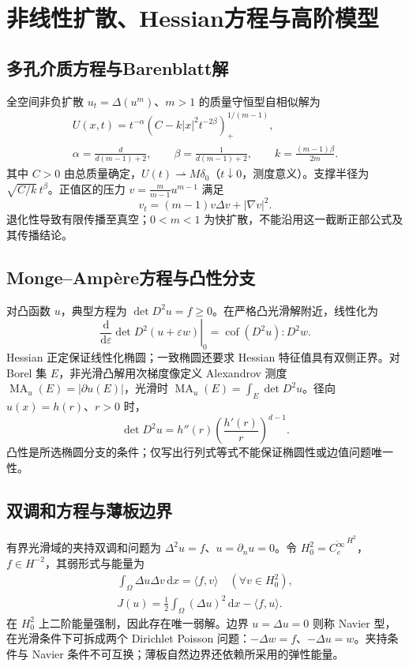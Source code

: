 \documentclass[../main.tex]{subfiles}
\begin{document}
\section{非线性扩散、Hessian方程与高阶模型}
\subsection{多孔介质方程与Barenblatt解}
全空间非负扩散 $u_t=\Delta(u^m)$、$m>1$ 的质量守恒型自相似解为
\begin{gather*}
U(x,t)=t^{-\alpha}\left(C-k|x|^2t^{-2\beta}\right)_+^{1/(m-1)},\\
\alpha=\frac d{d(m-1)+2},\qquad
\beta=\frac1{d(m-1)+2},\qquad k=\frac{(m-1)\beta}{2m}.
\end{gather*}
其中 $C>0$ 由总质量确定，$U(t)\rightharpoonup M\delta_0$（$t\downarrow0$，测度意义）。支撑半径为 $\sqrt{C/k}\,t^\beta$。正值区的压力 $v=\frac m{m-1}u^{m-1}$ 满足
\[
v_t=(m-1)v\Delta v+|\nabla v|^2.
\]
退化性导致有限传播至真空；$0<m<1$ 为快扩散，不能沿用这一截断正部公式及其传播结论。
\subsection{Monge--Ampère方程与凸性分支}
对凸函数 $u$，典型方程为 $\det D^2u=f\ge0$。在严格凸光滑解附近，线性化为
\[
\left.\frac{\mathrm d}{\mathrm d\varepsilon}\det D^2(u+\varepsilon w)\right|_{0}
=\operatorname{cof}(D^2u):D^2w.
\]
Hessian 正定保证线性化椭圆；一致椭圆还要求 Hessian 特征值具有双侧正界。对 Borel 集 $E$，非光滑凸解用次梯度像定义 Alexandrov 测度 $\operatorname{MA}_u(E)=|\partial u(E)|$，光滑时 $\operatorname{MA}_u(E)=\int_E\det D^2u$。径向 $u(x)=h(r)$、$r>0$ 时，
\[
\det D^2u=h''(r)\left(\frac{h'(r)}r\right)^{d-1}.
\]
凸性是所选椭圆分支的条件；仅写出行列式等式不能保证椭圆性或边值问题唯一性。
\subsection{双调和方程与薄板边界}
有界光滑域的夹持双调和问题为 $\Delta^2u=f$、$u=\partial_nu=0$。令 $H_0^2=\overline{C_c^\infty}^{\,H^2}$，$f\in H^{-2}$，其弱形式与能量为
\begin{gather*}
\int_\Omega\Delta u\Delta v\,\mathrm dx=\langle f,v\rangle
\quad(\forall v\in H_0^2),\\
J(u)=\frac12\int_\Omega(\Delta u)^2\,\mathrm dx-\langle f,u\rangle.
\end{gather*}
在 $H_0^2$ 上二阶能量强制，因此存在唯一弱解。边界 $u=\Delta u=0$ 则称 Navier 型，在光滑条件下可拆成两个 Dirichlet Poisson 问题：$-\Delta w=f$、$-\Delta u=w$。夹持条件与 Navier 条件不可互换；薄板自然边界还依赖所采用的弹性能量。
\end{document}
